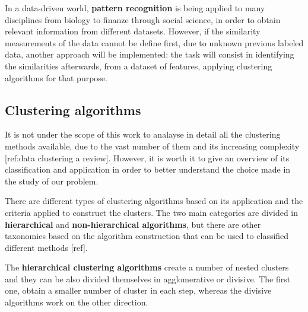 

In a data-driven world, \textbf{pattern recognition} is being applied to many disciplines from biology to finanze through social science, in order to obtain relevant information from different datasets.
However, if the similarity measurements of the data cannot be define first, due to unknown previous labeled data, another approach will be implemented: the task will consist in identifying the similarities afterwards, from a dataset of features, applying clustering algorithms for that purpose.

\subsection{Clustering algorithms}

It is not under the scope of this work to analayse in detail all the clustering methods available, due to the vast number of them and its increasing complexity [ref:data clustering a review]. However, it is worth it to give an overview of its classification and application in order to better understand the choice made in the study of our problem.

There are different types of clustering algorithms based on its application and the criteria applied to construct the clusters. The two main categories are divided in \textbf{hierarchical} and \textbf{non-hierarchical algorithms}, but there are other taxonomies based on the algorithm construction that can be used to classified different methods [ref].

The \textbf{hierarchical clustering algorithms} create a number of nested clusters and they can be also divided themselves in agglomerative or divisive. The first one, obtain a smaller number of cluster in each step, whereas the divisive algorithms work on the other direction.

